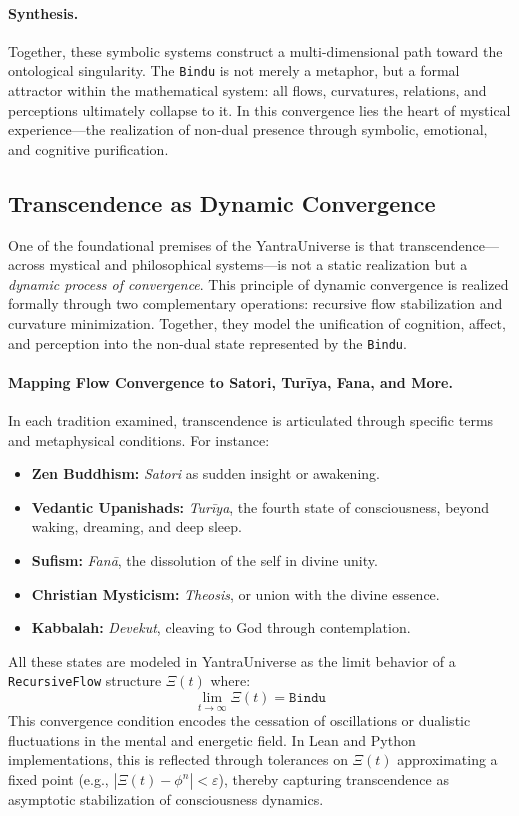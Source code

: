 \documentclass[12pt]{article}
\theoremstyle{plain}
\begin{document}
\paragraph{Synthesis.}
Together, these symbolic systems construct a multi-dimensional path toward the ontological singularity. The \texttt{Bindu} is not merely a metaphor, but a formal attractor within the mathematical system: all flows, curvatures, relations, and perceptions ultimately collapse to it. In this convergence lies the heart of mystical experience—the realization of non-dual presence through symbolic, emotional, and cognitive purification.

\subsection{Transcendence as Dynamic Convergence}

One of the foundational premises of the YantraUniverse is that transcendence—across mystical and philosophical systems—is not a static realization but a \emph{dynamic process of convergence}. This principle of dynamic convergence is realized formally through two complementary operations: recursive flow stabilization and curvature minimization. Together, they model the unification of cognition, affect, and perception into the non-dual state represented by the \texttt{Bindu}.

\paragraph{Mapping Flow Convergence to Satori, Turīya, Fana, and More.}
In each tradition examined, transcendence is articulated through specific terms and metaphysical conditions. For instance:
\begin{itemize}
    \item \textbf{Zen Buddhism:} \textit{Satori} as sudden insight or awakening.
    \item \textbf{Vedantic Upanishads:} \textit{Turīya}, the fourth state of consciousness, beyond waking, dreaming, and deep sleep.
    \item \textbf{Sufism:} \textit{Fanā}, the dissolution of the self in divine unity.
    \item \textbf{Christian Mysticism:} \textit{Theosis}, or union with the divine essence.
    \item \textbf{Kabbalah:} \textit{Devekut}, cleaving to God through contemplation.
\end{itemize}
All these states are modeled in YantraUniverse as the limit behavior of a \texttt{RecursiveFlow} structure $\Xi(t)$ where:
\[
\lim_{t \to \infty} \Xi(t) = \texttt{Bindu}
\]
This convergence condition encodes the cessation of oscillations or dualistic fluctuations in the mental and energetic field. In Lean and Python implementations, this is reflected through tolerances on $\Xi(t)$ approximating a fixed point (e.g., $|\Xi(t) - \phi^n| < \varepsilon$), thereby capturing transcendence as asymptotic stabilization of consciousness dynamics.
\end{document}
